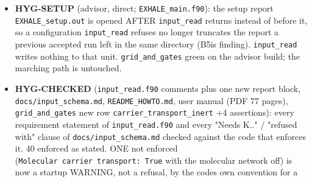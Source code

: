 \documentclass[english,a4paper]{my_memo}
\begin{document}
\begin{itemize}
  complete run). Scope exactly \texttt{carrier\_in\_newton\ .and.\ thereis\_mol\ .and.\ .not.\ carrier\_transport}, not gated on the Newton key (the direct steady
  route \texttt{EXHALE\_PTC=1} runs a coupled solve too, and it is the route B5b to
  B5h used); the atomic coupled solve with an element row is accepted
  (asserted). No shipped configuration is refused (MEASURED by grep: no
  \texttt{*.inp} in the tree sets the key; 62 of 81 B5-series scratch inputs
  would be, as the decision says). Two molecular cases byte-identical
  before/after at 200 steps. The parse-site comment that claimed "checked
  below" for a check that did not exist is corrected. A refused run leaves
  a zero-byte \texttt{EXHALE\_setup.out} and no \texttt{EXHALE\_resolved.out}, like every
  other \texttt{input\_read} refusal. Tests RED (the eliminated-H2 coupled run
  completed and printed a Mdot) / GREEN; advisor \texttt{grid\_and\_gates} 98/0,
  \texttt{physics\_probe} 1491/0. Advisor corrected \texttt{docs/input\_schema.md} K15e
  ("needs K15d" now qualified to the molecular configuration). Recorded:
  \texttt{EXHALE\_main.f90} opens \texttt{EXHALE\_setup.out} (truncating) before
  \texttt{input\_read}, so any refusal erases the previous run\textquotesingle s setup report (fix:
  open it after the input is accepted); the other "checked below" comments
  of \texttt{input\_read.f90} deserve a sweep against the checks that exist.
\item
  \textbf{HYG-SETUP} (advisor, direct; \texttt{EXHALE\_main.f90}): the setup report
  \texttt{EXHALE\_setup.out} is opened AFTER \texttt{input\_read} returns instead of before
  it, so a configuration \texttt{input\_read} refuses no longer truncates the
  report a previous accepted run left in the same directory (B5i\textquotesingle s
  finding). \texttt{input\_read} writes nothing to that unit. \texttt{grid\_and\_gates}
  green on the advisor build; the marching path is untouched.
\item
  \textbf{HYG-CHECKED} (\texttt{input\_read.f90} comments plus one new report block,
  \texttt{docs/input\_schema.md}, \texttt{README\_HOWTO.md}, user manual (PDF 77 pages),
  \texttt{grid\_and\_gates} new row \texttt{carrier\_transport\_inert} +4 assertions): every
  requirement statement of \texttt{input\_read.f90} and every "Needs K.." /
  "refused with" clause of \texttt{docs/input\_schema.md} checked against the code
  that enforces it. 40 enforced as stated. ONE not enforced (\texttt{Molecular\ carrier\ transport:\ True} with the molecular network off) is now a
  startup WARNING, not a refusal, by the code\textquotesingle s own convention for a

\end{itemize}
\end{document}
